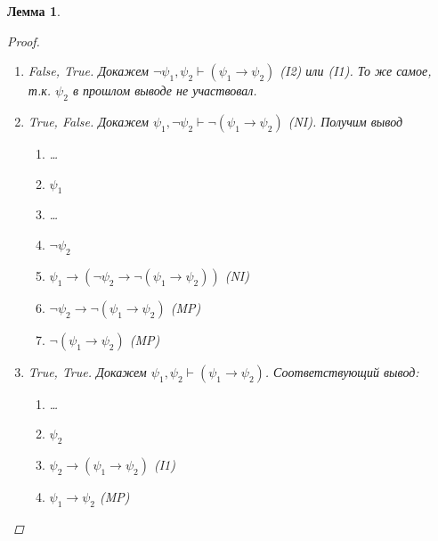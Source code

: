 \documentclass[12pt]{article}
\let\im\rightarrow
\let\n\neg
\theoremstyle{definition}
\theoremstyle{plain}
\newtheorem{lemma}{Лемма}[section]
\theoremstyle{remark}
\begin{document}
\begin{lemma}
\begin{proof}
\begin{itemize}
\begin{enumerate}
\begin{enumerate}
              \item $\n \psi_1$

              \item $\n \psi_1 \im (\psi_1 \im \psi_2)$ (I2)

              \item $\psi_1 \im \psi_2$ (MP)
            \end{enumerate}

          \item False, True. Докажем $\n \psi_1, \psi_2 \vdash
            (\psi_1 \im \psi_2)$ (I2) или (I1). То же самое, т.к.
            $\psi_2$ в прошлом выводе не участвовал.

          \item True, False. Докажем $\psi_1, \n \psi_2 \vdash \n
            (\psi_1 \im \psi_2)$ (NI). Получим вывод
            \begin{enumerate}
              \item \dots

              \item $\psi_1$

              \item \dots

              \item $\n \psi_2$

              \item $\psi_1 \im (\n \psi_2 \im \n(\psi_1 \im \psi_2))$ (NI)

              \item $\n \psi_2 \im \n (\psi_1 \im \psi_2)$ (MP)

              \item $\n (\psi_1 \im \psi_2)$ (MP)
            \end{enumerate}

          \item True, True. Докажем $\psi_1, \psi_2 \vdash (\psi_1
            \im \psi_2)$. Соответствующий вывод:
            \begin{enumerate}
              \item \dots

              \item $\psi_2$

              \item $\psi_2 \im (\psi_1 \im \psi_2)$ (I1)

              \item $\psi_1 \im \psi_2$ (MP)
            \end{enumerate}
        \end{enumerate}
    \end{itemize}
  \end{proof}
\end{lemma}
\end{document}
